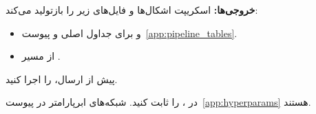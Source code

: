 \textbf{خروجی‌ها:} اسکریپت \texttt{} اشکال‌ها و فایل‌های زیر را بازتولید می‌کند:
\begin{itemize}[leftmargin=2em]
  \item \texttt{} و \texttt{} برای جداول اصلی و پیوست~\ref{app:pipeline_tables}.
  \item \texttt{} از مسیر \texttt{}.
\end{itemize}
پیش از ارسال، \texttt{} را اجرا کنید.

در \texttt{}، \texttt{} را ثابت کنید. شبکه‌های ابرپارامتر در پیوست~\ref{app:hyperparams} هستند.
